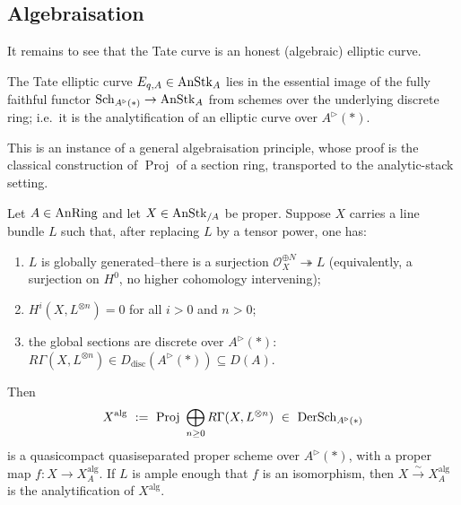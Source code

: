 \subsection{Algebraisation}
\label{subsec:21:algebraisation}

It remains to see that the Tate curve is an honest (algebraic) elliptic curve.

\begin{theorem}[$E_q$ is algebraic]
\label{thm:21:tate-algebraic}
The Tate elliptic curve $E_{q,A}\in\operatorname{AnStk}_A$ lies in the essential image of the
fully faithful functor $\mathrm{Sch}_{A^{\triangleright}(\ast)}\to\operatorname{AnStk}_A$ from
schemes over the underlying discrete ring; i.e.\ it is the analytification of an
elliptic curve over $A^{\triangleright}(\ast)$.
\end{theorem}

This is an instance of a general algebraisation principle, whose proof is the
classical construction of $\operatorname{Proj}$ of a section ring, transported to
the analytic-stack setting.

\begin{proposition}
\label{prop:21:algebraisation}
Let $A\in\operatorname{AnRing}$ and let $X\in\operatorname{AnStk}_{/A}$ be proper. Suppose $X$ carries a line
bundle $L$ such that, after replacing $L$ by a tensor power, one has:
\begin{enumerate}
\item $L$ is globally generated--there is a surjection
$\mathcal O_X^{\oplus N}\twoheadrightarrow L$ (equivalently, a surjection on
$H^0$, no higher cohomology intervening);
\item $H^i(X,L^{\otimes n})=0$ for all $i>0$ and $n>0$;
\item the global sections are discrete over $A^{\triangleright}(\ast)$:
$R\Gamma(X,L^{\otimes n})\in D_{\mathrm{disc}}(A^{\triangleright}(\ast))\subseteq D(A)$.
\end{enumerate}
Then
\begin{equation*}
X^{\mathrm{alg}}\ :=\ \Proj\ \bigoplus_{n\ge0} R\Gamma(X,L^{\otimes n})\ \in\
\mathrm{DerSch}_{A^{\triangleright}(\ast)}
\end{equation*}
is a quasicompact quasiseparated proper scheme over $A^{\triangleright}(\ast)$,
with a proper map $f\colon X\to X^{\mathrm{alg}}_A$. If $L$ is ample enough that
$f$ is an isomorphism, then $X\xrightarrow{\sim}X^{\mathrm{alg}}_A$ is the
analytification of $X^{\mathrm{alg}}$.
\end{proposition}

